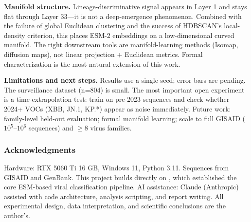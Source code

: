 \documentclass{article}
\begin{document}
\textbf{Manifold structure.} Lineage-discriminative signal appears in Layer 1 and stays flat through Layer 33---it is not a deep-emergence phenomenon. Combined with the failure of global Euclidean clustering and the success of HDBSCAN's local-density criterion, this places ESM-2 embeddings on a low-dimensional curved manifold. The right downstream tools are manifold-learning methods (Isomap, diffusion maps), not linear projection + Euclidean metrics. Formal characterization is the most natural extension of this work.

\textbf{Limitations and next steps.} Results use a single seed; error bars are pending. The surveillance dataset (n=804) is small. The most important open experiment is a time-extrapolation test: train on pre-2023 sequences and check whether 2024+ VOCs (XBB, JN.1, KP.*) appear as noise immediately. Future work: family-level held-out evaluation; formal manifold learning; scale to full GISAID ($10^5$--$10^6$ sequences) and $\geq$8 virus families.

\subsubsection*{Acknowledgments}
Hardware: RTX 5060 Ti 16 GB, Windows 11, Python 3.11. Sequences from GISAID and GenBank. This project builds directly on \citet{passion2025virusproject}, which established the core ESM-based viral classification pipeline. AI assistance: Claude (Anthropic) assisted with code architecture, analysis scripting, and report writing. All experimental design, data interpretation, and scientific conclusions are the author's.



\end{document}
